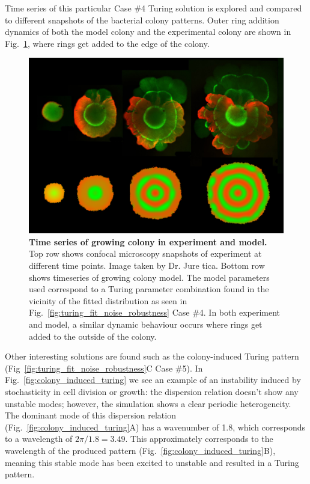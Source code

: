 Time series of this particular Case \#4 Turing solution is explored and compared to different snapshots of the bacterial colony patterns.
Outer ring addition dynamics of both the model colony and the experimental colony are shown in Fig.~\ref{fig:outer_ring_addition_modelvsexperiment}, where rings get added to the edge of the colony.
\begin{figure}[H] %
    \centering
    \begin{adjustbox}{center}
        \includegraphics[width=1\textwidth]{chapters/Chapter 3/outer_ring_addition_modelvsexperiment} %
    \end{adjustbox}
    \caption{\textbf{Time series of growing colony in experiment and model.} Top row shows confocal microscopy snapshots of experiment at different time points. Image taken by Dr. Jure tica. Bottom row shows timeseries of growing colony model. The model parameters used correspond to a Turing parameter combination found in the vicinity of the fitted distribution as seen in Fig.~\ref{fig:turing_fit_noise_robustness} Case \#4. In both experiment and model, a similar dynamic behaviour occurs where rings get added to the outside of the colony.}
    \label{fig:outer_ring_addition_modelvsexperiment}
\end{figure}

Other interesting solutions are found such as the colony-induced Turing pattern (Fig~\ref{fig:turing_fit_noise_robustness}C Case \#5).
In Fig.~\ref{fig:colony_induced_turing} we see an example of an instability induced by stochasticity in cell division or growth: the dispersion relation doesn’t show any unstable modes; however, the simulation shows a clear periodic heterogeneity.
The dominant mode of this dispersion relation (Fig.~\ref{fig:colony_induced_turing}A) has a wavenumber of 1.8, which corresponds to a wavelength of $2\pi/1.8=3.49$.
This approximately corresponds to the wavelength of the produced pattern (Fig.~\ref{fig:colony_induced_turing}B), meaning this stable mode has been excited to unstable and resulted in a Turing pattern.


